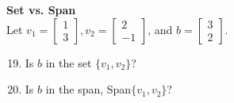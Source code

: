 \documentclass[12pt]{article}
\begin{document}
\textbf{Set vs. Span} \\
Let $v_1 = \begin{bmatrix} 1 \\ 3 \end{bmatrix}, v_2 = \begin{bmatrix} 2 \\ -1 \end{bmatrix}$, and $b = \begin{bmatrix} 3 \\ 2 \end{bmatrix}$.
\begin{enumerate}
\setcounter{enumi}{18}
    \item Is $b$ in the set $\{v_1, v_2\}$?
    \item Is $b$ in the span, Span$\{v_1, v_2\}$?
\end{enumerate}
\end{document}
